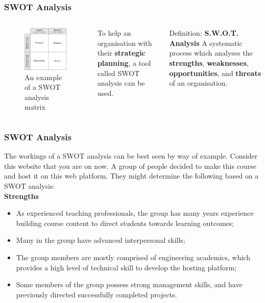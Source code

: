 \documentclass{beamer}
\begin{document}
\begin{frame}
\frametitle{SWOT Analysis}
\begin{columns}
\begin{figure}
\includegraphics[scale=0.7]{SWOT}
\caption{An example of a SWOT analysis matrix}
\end{figure}
To help an organisation with their \textbf{strategic planning}, a tool called SWOT analysis can be used.
\vspace{0.5cm}
 
\begin{block}{Definition: \textbf{S.W.O.T. Analysis}}
A systematic process which analyses the \textbf{strengths}, \textbf{weaknesses}, \textbf{opportunities}, and \textbf{threats} of an organisation.
\end{block}
\end{columns}
\end{frame}

\begin{frame}
\frametitle{SWOT Analysis}
The workings of a SWOT analysis can be best seen by way of example. Consider this website that you are on now. A group of people decided to make this course and host it on this web platform. They might determine the following based on a SWOT analysis:\\
\vspace{0.5cm}
\textbf{Strengths}
\begin{itemize}
\item As experienced teaching professionals, the group has many years experience building course content to direct students towards learning outcomes;
\item Many in the group have advanced interpersonal skills;
\item The group members are mostly comprised of engineering academics, which provides a high level of technical skill to develop the hosting platform;
\item Some members of the group possess strong management skills, and have previously directed successfully completed projects.
\end{itemize}
\end{frame}
\end{document}
